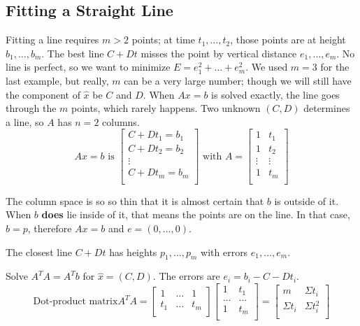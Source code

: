 \subsection{Fitting a Straight Line}

Fitting a line requires \(m > 2\) points; at time \(t_1, \ldots, t_2\), those points are at height \(b_1, \ldots, b_m\). The best line \(C + Dt\) misses the point by vertical distance \(e_1, \ldots, e_m\). No line is perfect, so we want to minimize \(E = e^2_1 + \ldots + e^2_m\). We used \(m = 3\) for the last example, but really, \(m\) can be a very large number; though we will still have the component of \(\hat{x}\)  be \(C\) and \(D\).
When \(Ax = b\) is solved exactly, the line goes through the \(m\) points, which rarely happens. Two unknown \((C, D)\) determines a line, so \(A\) has \(n = 2\) columns. 
\[
    Ax = b 
    \text{ is }
    \begin{bmatrix}
         C + Dt_1 = b_1 \\
         C + Dt_2 = b_2\\
         \vdots \\
         C + Dt_m = b_m \\
    \end{bmatrix}
    \text{ with }
    A = 
    \begin{bmatrix}
        1 & t_1  \\
        1 & t_2  \\
        \vdots & \vdots  \\
        1 & t_m  \\
    \end{bmatrix}
\]     

The column space is so so thin that it is almost certain that \(b\) is outside of it. When \(b\) \textbf{does} lie inside of it, that means the points are on the line. In that case, \(b = p\), therefore \(Ax = b\) and \(e = (0, \ldots, 0)\). 

The closest line \(C + Dt\) has heights \(p_1, \ldots, p_m\) with errors \(e_1, \ldots, e_m\). 

Solve \(A^T A = A^T b\) for \( \hat{x} = (C, D)\). The errors are \(e_i = b_i - C -Dt_i\). 
\[
    \text{Dot-product matrix}
    A^T A = 
    \begin{bmatrix}
        1 & \ldots & 1  \\
        t_1 & \ldots & t_m  \\
    \end{bmatrix}
    \begin{bmatrix}
        1 & t_1  \\
        \ldots & \ldots  \\
        1 &  t_m \\
    \end{bmatrix}
    = 
    \begin{bmatrix}
        m & \Sigma t_i  \\
        \Sigma t_i & \Sigma t^2_i  \\
    \end{bmatrix}
\]

